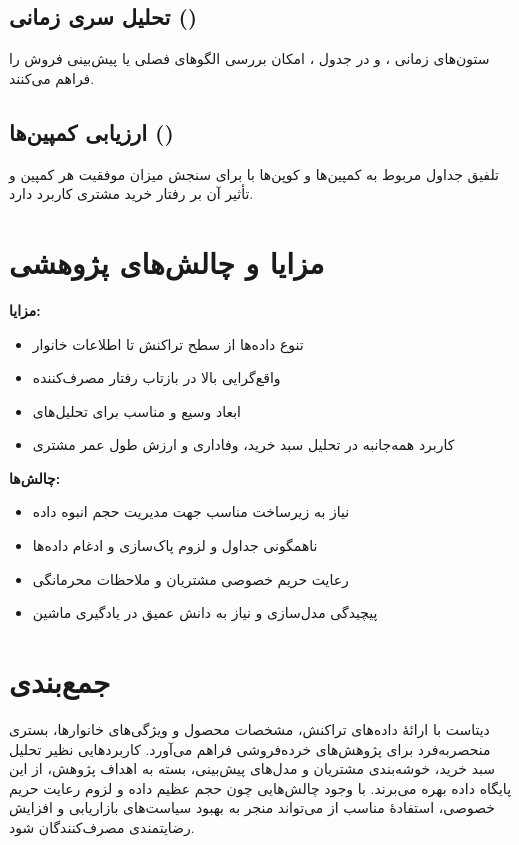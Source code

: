 \documentclass[12pt]{article}
\begin{document}
\subsection{\textbf{تحلیل سری زمانی ()}}
\noindent ستون‌های زمانی ،  و  در جدول ، امکان بررسی الگوهای فصلی یا پیش‌بینی فروش را فراهم می‌کنند.

\subsection{\textbf{ارزیابی کمپین‌ها ()}}
\noindent تلفیق جداول مربوط به کمپین‌ها و کوپن‌ها با  برای سنجش میزان موفقیت هر کمپین و تأثیر آن بر رفتار خرید مشتری کاربرد دارد.

\section{\textbf{مزایا و چالش‌های پژوهشی}}
\noindent \textbf{مزایا:}
\begin{itemize}
  \item تنوع داده‌ها از سطح تراکنش تا اطلاعات خانوار
  \item واقع‌گرایی بالا در بازتاب رفتار مصرف‌کننده
  \item ابعاد وسیع و مناسب برای تحلیل‌های 
  \item کاربرد همه‌جانبه در تحلیل سبد خرید، وفاداری و ارزش طول عمر مشتری
\end{itemize}

\noindent \textbf{چالش‌ها:}
\begin{itemize}
  \item نیاز به زیرساخت مناسب جهت مدیریت حجم انبوه داده
  \item ناهمگونی جداول و لزوم پاک‌سازی و ادغام داده‌ها
  \item رعایت حریم خصوصی مشتریان و ملاحظات محرمانگی
  \item پیچیدگی مدل‌سازی و نیاز به دانش عمیق در یادگیری ماشین
\end{itemize}

\section{\textbf{جمع‌بندی}}
\noindent دیتاست  با ارائهٔ داده‌های تراکنش، مشخصات محصول و ویژگی‌های خانوارها، بستری منحصربه‌فرد برای پژوهش‌های خرده‌فروشی فراهم می‌آورد. کاربردهایی نظیر تحلیل سبد خرید، خوشه‌بندی مشتریان و مدل‌های پیش‌بینی، بسته به اهداف پژوهش، از این پایگاه داده بهره می‌برند. با وجود چالش‌هایی چون حجم عظیم داده و لزوم رعایت حریم خصوصی، استفادهٔ مناسب از  می‌تواند منجر به بهبود سیاست‌های بازاریابی و افزایش رضایتمندی مصرف‌کنندگان شود.
\end{document}
